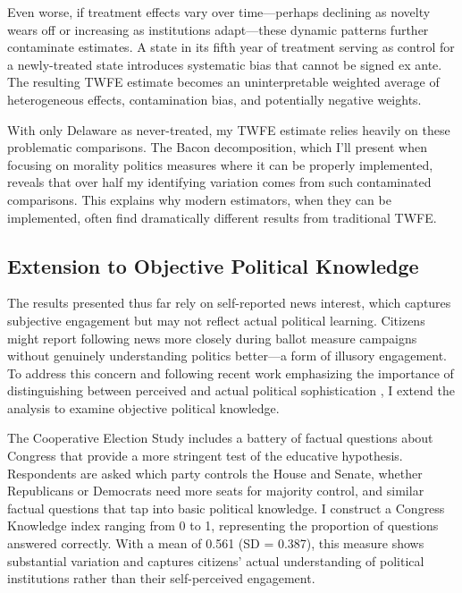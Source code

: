 \documentclass[12pt,letterpaper,oneside]{book}
\begin{document}
Even worse, if treatment effects vary over time---perhaps declining as novelty wears off or increasing as institutions adapt---these dynamic patterns further contaminate estimates. A state in its fifth year of treatment serving as control for a newly-treated state introduces systematic bias that cannot be signed ex ante. The resulting TWFE estimate becomes an uninterpretable weighted average of heterogeneous effects, contamination bias, and potentially negative weights.

With only Delaware as never-treated, my TWFE estimate relies heavily on these problematic comparisons. The Bacon decomposition, which I'll present when focusing on morality politics measures where it can be properly implemented, reveals that over half my identifying variation comes from such contaminated comparisons. This explains why modern estimators, when they can be implemented, often find dramatically different results from traditional TWFE.

\subsection{Extension to Objective Political Knowledge}

The results presented thus far rely on self-reported news interest, which captures subjective engagement but may not reflect actual political learning. Citizens might report following news more closely during ballot measure campaigns without genuinely understanding politics better—a form of illusory engagement. To address this concern and following recent work emphasizing the importance of distinguishing between perceived and actual political sophistication \citep{delli1996americans, prior2007post, lupia2016uninformed}, I extend the analysis to examine objective political knowledge.

The Cooperative Election Study includes a battery of factual questions about Congress that provide a more stringent test of the educative hypothesis. Respondents are asked which party controls the House and Senate, whether Republicans or Democrats need more seats for majority control, and similar factual questions that tap into basic political knowledge. I construct a Congress Knowledge index ranging from 0 to 1, representing the proportion of questions answered correctly. With a mean of 0.561 (SD = 0.387), this measure shows substantial variation and captures citizens' actual understanding of political institutions rather than their self-perceived engagement.
\end{document}
